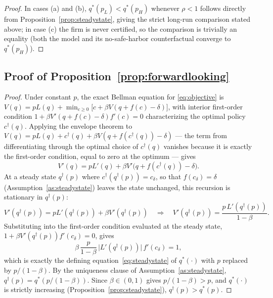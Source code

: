 \begin{proof}
In cases (a) and (b), $q^*(p_L) < q^*(p_H)$ whenever $\rho < 1$ follows directly from Proposition~\ref{prop:steadystate}, giving the strict long-run comparison stated above; in case (c) the firm is never certified, so the comparison is trivially an equality (both the model and its no-safe-harbor counterfactual converge to $q^*(p_H)$).
\end{proof}

\subsection{Proof of Proposition~\ref{prop:forwardlooking}}
\begin{proof}
Under constant $p$, the exact Bellman equation for \eqref{eq:objective} is $V(q) = pL(q) + \min_{c\geq0}\big[c+\beta V(q+f(c)-\delta)\big]$, with interior first-order condition $1+\beta V'(q+f(c)-\delta)f'(c) = 0$ characterizing the optimal policy $c^{\dagger}(q)$. Applying the envelope theorem to $V(q) = pL(q) + c^{\dagger}(q) + \beta V(q+f(c^{\dagger}(q))-\delta)$ — the term from differentiating through the optimal choice of $c^{\dagger}(q)$ vanishes because it is exactly the first-order condition, equal to zero at the optimum — gives
\[
V'(q) = pL'(q) + \beta V'\big(q+f(c^{\dagger}(q))-\delta\big).
\]
At a steady state $q^{\dagger}(p)$ where $c^{\dagger}(q^{\dagger}(p)) = c_\delta$, so that $f(c_\delta)=\delta$ (Assumption~\ref{as:steadystate}) leaves the state unchanged, this recursion is stationary in $q^{\dagger}(p)$:
\[
V'(q^{\dagger}(p)) = pL'(q^{\dagger}(p)) + \beta V'(q^{\dagger}(p)) \quad\Longrightarrow\quad V'(q^{\dagger}(p)) = \frac{p\,L'(q^{\dagger}(p))}{1-\beta}.
\]
Substituting into the first-order condition evaluated at the steady state, $1+\beta V'(q^{\dagger}(p))f'(c_\delta)=0$, gives
\[
\beta\,\frac{p}{1-\beta}\,\big|L'(q^{\dagger}(p))\big|\,f'(c_\delta) = 1,
\]
which is exactly the defining equation~\eqref{eq:steadystate} of $q^*(\cdot)$ with $p$ replaced by $p/(1-\beta)$. By the uniqueness clause of Assumption~\ref{as:steadystate}, $q^{\dagger}(p) = q^*(p/(1-\beta))$. Since $\beta\in(0,1)$ gives $p/(1-\beta) > p$, and $q^*(\cdot)$ is strictly increasing (Proposition~\ref{prop:steadystate}), $q^{\dagger}(p) > q^*(p)$.
\end{proof}

